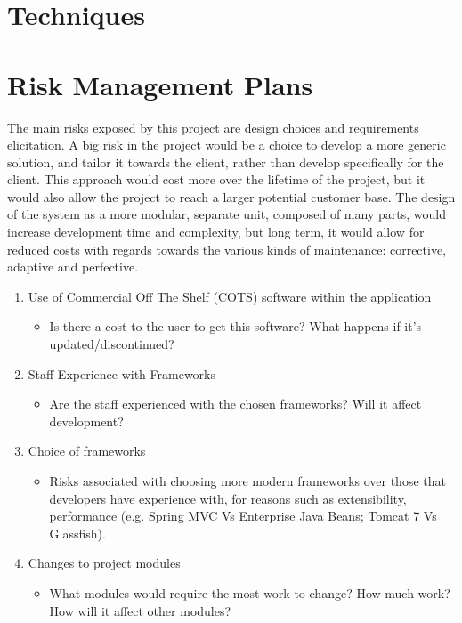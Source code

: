 \section{Techniques}

\section{Risk Management Plans}

The main risks exposed by this project are design choices and requirements elicitation. A big risk in the project would be a choice to develop a more generic solution, and tailor it towards the client, rather than develop specifically for the client. This approach would cost more over the lifetime of the project, but it would also allow the project to reach a larger potential customer base. The design of the system as a more modular, separate unit, composed of many parts, would increase development time and complexity, but long term, it would allow for reduced costs with regards towards the various kinds of maintenance: corrective, adaptive and perfective. 

\begin{enumerate}
\item Use of Commercial Off The Shelf (COTS) software within the application
\begin{itemize}
\item Is there a cost to the user to get this software? What happens if it's updated/discontinued?
\end{itemize}
\item Staff Experience with Frameworks
\begin{itemize}
\item Are the staff experienced with the chosen frameworks? Will it affect development?
\end{itemize}
\item Choice of frameworks
\begin{itemize}
\item Risks associated with choosing more modern frameworks over those that developers have experience with, for reasons such as extensibility, performance (e.g. Spring MVC Vs Enterprise Java Beans; Tomcat 7 Vs Glassfish).
\end{itemize}
\item Changes to project modules
\begin{itemize}
\item What modules would require the most work to change? How much work? How will it affect other modules?
\end{itemize}
\end{enumerate}

